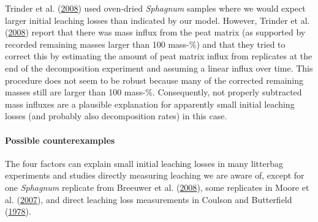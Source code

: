 \documentclass[
  12pt,
]{article}
\begin{document}
Trinder et al. (\protect\hyperlink{ref-Trinder.2008}{2008}) used oven-dried \emph{Sphagnum} samples where we would expect larger initial leaching losses than indicated by our model. However, Trinder et al. (\protect\hyperlink{ref-Trinder.2008}{2008}) report that there was mass influx from the peat matrix (as supported by recorded remaining masses larger than 100 mass-\%) and that they tried to correct this by estimating the amount of peat matrix influx from replicates at the end of the decomposition experiment and assuming a linear influx over time. This procedure does not seem to be robust because many of the corrected remaining masses still are larger than 100 mass-\%. Consequently, not properly subtracted mass influxes are a plausible explanation for apparently small initial leaching losses (and probably also decomposition rates) in this case.

\hypertarget{possible-counterexamples}{%
\paragraph*{Possible counterexamples}\label{possible-counterexamples}}

The four factors can explain small initial leaching losses in many litterbag experiments and studies directly measuring leaching we are aware of, except for one \emph{Sphagnum} replicate from Breeuwer et al. (\protect\hyperlink{ref-Breeuwer.2008}{2008}), some replicates in Moore et al. (\protect\hyperlink{ref-Moore.2007}{2007}), and direct leaching loss measurements in Coulson and Butterfield (\protect\hyperlink{ref-Coulson.1978}{1978}).
\end{document}
